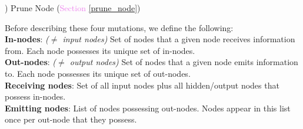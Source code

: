 \documentclass{article} %
\begin{document}
\vspace{-.5em}\;\;) Prune Node (\textcolor{violet}{Section \ref{prune_node}})

Before describing these four mutations, we define the following:\\
\textbf{In-nodes}: \textit{($\neq$ input nodes)} Set of nodes that a given node receives information from. Each node possesses its unique set of in-nodes.\\
\textbf{Out-nodes}: \textit{($\neq$ output nodes)} Set of nodes that a given node emits information to. Each node possesses its unique set of out-nodes.\\
\textbf{Receiving nodes}: Set of all input nodes plus all hidden/output nodes that possess in-nodes.\\
\textbf{Emitting nodes}: List of nodes possessing out-nodes. Nodes appear in this list once per out-node that they possess.
\end{document}
